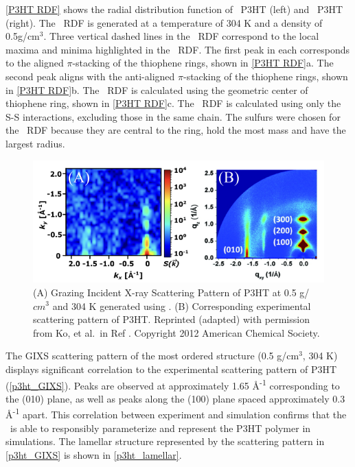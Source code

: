 \autoref{P3HT RDF} shows the radial distribution function of \espff~P3HT (left) and \oplsff~P3HT (right). 
 The \espff~RDF is generated at a temperature of 304 K and a density of 0.5g/cm$^3$. 
 Three vertical dashed lines in the \espff~RDF correspond to the local maxima and minima highlighted in the \oplsff~RDF. 
 The first peak in each corresponds to the aligned $\pi$-stacking of the thiophene rings, shown in \autoref{P3HT RDF}a. 
 The second peak aligns with the anti-aligned $\pi$-stacking of the thiophene rings, shown in \autoref{P3HT RDF}b. 
 The \oplsff~RDF is calculated using the geometric center of thiophene ring, shown in \autoref{P3HT RDF}c. 
 The \espff~RDF is calculated using only the S-S interactions, excluding those in the same chain. 
 The sulfurs were chosen for the \espff~RDF because they are central to the ring, hold the most mass and have the largest radius. 
\begin{figure}[h!]
    \centering
    \includegraphics[width=.8\textwidth]{src/figures/FF_figs/p3htGIXS&exp.png}
    \caption{(A) Grazing Incident X-ray Scattering Pattern of P3HT at 0.5 g/$cm^3$ and 304 K generated using \espff. (B) Corresponding experimental scattering pattern of P3HT. Reprinted (adapted) with permission from Ko, et al.~in Ref \citep{p3ht_experimental}. Copyright 2012 American Chemical Society.}
    \label{p3ht_GIXS}
\end{figure}
\par The GIXS scattering pattern of the most ordered structure (0.5 g/cm$^3$, 304 K) displays significant correlation to the experimental scattering pattern of P3HT (\autoref{p3ht_GIXS}). 
 Peaks are observed at approximately 1.65 \AA \textsuperscript{-1} corresponding to the (010) plane, as well as peaks along the (100) plane spaced approximately 0.3 \AA \textsuperscript{-1} apart. 
 This correlation between experiment and simulation confirms that the \espff~is able to responsibly parameterize and represent the P3HT polymer in simulations. 
 The lamellar structure represented by the scattering pattern in \autoref{p3ht_GIXS} is shown in \autoref{p3ht_lamellar}. 
